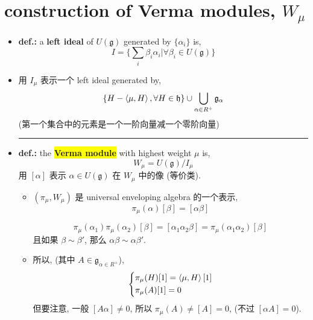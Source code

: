 \section{construction of Verma modules, \texorpdfstring{$W_\mu$}{W\_mu}}
\begin{itemize}
	\item \textbf{def.:} a \textbf{left ideal} of $U(\mathfrak{g})$ generated by $\{\alpha_i\}$ is,
	\begin{equation}
		I = \Big\{ \sum_i \beta_i \alpha_i \Big| \forall \beta_i \in U(\mathfrak{g}) \Big\}
	\end{equation}
	
	\item 用 $I_\mu$ 表示一个 left ideal generated by,
	\begin{equation} \label{8.5.2}
		\{H - \braket{\mu, H}, \forall H \in \mathfrak{h}\} \cup \bigcup_{\alpha \in R^+} \mathfrak{g}_\alpha
	\end{equation}
	(第一个集合中的元素是一个一阶向量减一个零阶向量)
	
	\noindent\rule[0.5ex]{\linewidth}{0.5pt} %
	
	\item \textbf{def.:} the \colorbox{yellow}{\textbf{Verma module}} with highest weight $\mu$ is,
	\begin{equation}
		W_\mu = U(\mathfrak{g}) / I_\mu
	\end{equation}
	用 $[\alpha]$ 表示 $\alpha \in U(\mathfrak{g})$ 在 $W_\mu$ 中的像 (等价类).
	\begin{itemize}
		\item $(\pi_\mu, W_\mu)$ 是 universal enveloping algebra 的一个表示,
		\begin{equation}
			\pi_\mu(\alpha) [\beta] = [\alpha \beta]
		\end{equation}
		
		\begin{tcolorbox}[title=proof:]
			\begin{equation}
				\pi_\mu(\alpha_1) \pi_\mu(\alpha_2) [\beta] = [\alpha_1 \alpha_2 \beta] = \pi_\mu(\alpha_1 \alpha_2) [\beta]
			\end{equation}
			且如果 $\beta \sim \beta'$, 那么 $\alpha \beta \sim \alpha \beta'$.
		\end{tcolorbox}
		
		\item 所以, (其中 $A \in \mathfrak{g}_{\alpha \in R^+}$),
		\begin{equation}
			\begin{dcases} \label{8.5.6}
				\pi_\mu(H) [1] = \braket{\mu, H} [1] \\
				\pi_\mu(A) [1] = 0
			\end{dcases}
		\end{equation}
		但要注意, 一般 $[A \alpha] \neq 0$, 所以 $\pi_\mu(A) \neq [A] = 0$, (不过 $[\alpha A] = 0$).
	\end{itemize}
	

\end{itemize}
